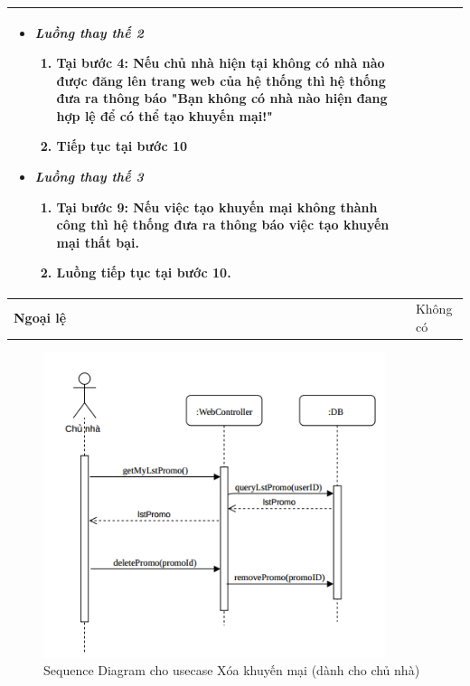 \begin{center}
\begin{longtable}{ | l |p{10cm}|}
\begin{itemize}
			\item \textit{Luồng thay thế 2}
			\begin{enumerate}
				\item Tại bước 4: Nếu chủ nhà hiện tại không có nhà nào được đăng lên trang web của hệ thống thì hệ thống đưa ra thông báo "Bạn không có nhà nào hiện đang hợp lệ để có thể tạo khuyến mại!"
				\item Tiếp tục tại bước 10 
			\end{enumerate}
			
			\item \textit{Luồng thay thế 3}
			\begin{enumerate}
				\item Tại bước 9: Nếu việc tạo khuyến mại không thành công thì hệ thống đưa ra thông báo việc tạo khuyến mại thất bại.
				\item Luồng tiếp tục tại bước 10. 
			\end{enumerate}
		\end{itemize} \\ \hline 
		\textbf{Ngoại lệ}  & Không có \\
		\hline
	\end{longtable}
\end{center}
\newpage 
{}
\begin{figure}[!h]
	\centering
	\includegraphics[width=10cm]{Image/deleteChuNhaPromo.png}
	\caption{Sequence Diagram cho usecase Xóa khuyến mại (dành cho chủ nhà)}
\end{figure}
	
